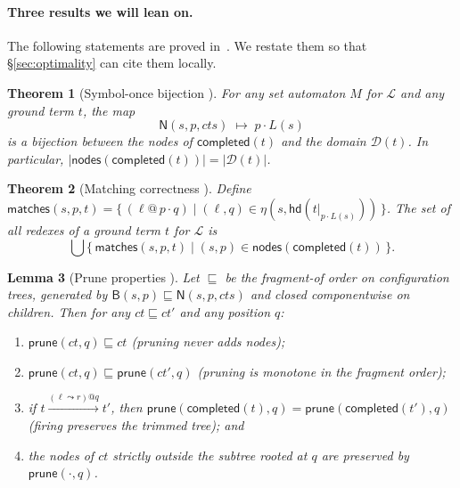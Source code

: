 \documentclass[11pt]{article}
\theoremstyle{plain}
\newtheorem{theorem}{Theorem}[section]
\newtheorem{lemma}[theorem]{Lemma}
\theoremstyle{definition}
\theoremstyle{remark}
\newcommand{\rew}{\leadsto}
\newcommand{\Lhs}{\mathcal{L}}
\newcommand{\hd}{\mathsf{hd}}
\newcommand{\dom}{\mathcal{D}}
\begin{document}
\paragraph{Three results we will lean on.}
The following statements are proved in~\cite[Thm.~1, Thm.~2,
Lemma~1]{BouwmanErkens2022}. We restate them so that
\S\ref{sec:optimality} can cite them locally.

\begin{theorem}[Symbol-once bijection {\cite[Thm.~1]{BouwmanErkens2022}}]\label{thm:be-sym-once}
For any set automaton $M$ for $\Lhs$ and any ground term $t$, the map
\[
  \mathsf{N}(s, p, \mathit{cts}) \;\longmapsto\; p \cdot L(s)
\]
is a bijection between the nodes of $\mathsf{completed}(t)$ and the
domain $\dom(t)$. In particular,
$|\mathsf{nodes}(\mathsf{completed}(t))| = |\dom(t)|$.
\end{theorem}

\begin{theorem}[Matching correctness {\cite[Thm.~2]{BouwmanErkens2022}}]\label{thm:be-match-correct}
Define $\mathsf{matches}(s, p, t) = \{\, (\ell @\, p \cdot q) \mid
(\ell, q) \in \eta(s, \hd(t|_{p \cdot L(s)})) \,\}$. The set of all
redexes of a ground term $t$ for $\Lhs$ is
\[
  \bigcup \{\, \mathsf{matches}(s, p, t) \mid (s, p) \in
              \mathsf{nodes}(\mathsf{completed}(t)) \,\}.
\]
\end{theorem}

\begin{lemma}[Prune properties {\cite[Lemma~1]{BouwmanErkens2022}}]\label{lem:be-prune}
Let $\sqsubseteq$ be the \emph{fragment-of} order on configuration
trees, generated by $\mathsf{B}(s, p) \sqsubseteq \mathsf{N}(s, p,
\mathit{cts})$ and closed componentwise on children. Then for any
$\mathit{ct} \sqsubseteq \mathit{ct}'$ and any position $q$:
\begin{enumerate}[label=\textup{(\roman*)},leftmargin=2.2em]
  \item $\mathsf{prune}(\mathit{ct}, q) \sqsubseteq \mathit{ct}$
        (pruning never adds nodes);
  \item $\mathsf{prune}(\mathit{ct}, q) \sqsubseteq \mathsf{prune}(\mathit{ct}', q)$
        (pruning is monotone in the fragment order);
  \item if $t \xrightarrow{(\ell \rew r) @ q} t'$, then
        $\mathsf{prune}(\mathsf{completed}(t), q)
         = \mathsf{prune}(\mathsf{completed}(t'), q)$
        (firing preserves the trimmed tree); and
  \item the nodes of $\mathit{ct}$ strictly outside the subtree rooted
        at $q$ are preserved by $\mathsf{prune}(\cdot, q)$.
\end{enumerate}
\end{lemma}
\end{document}
